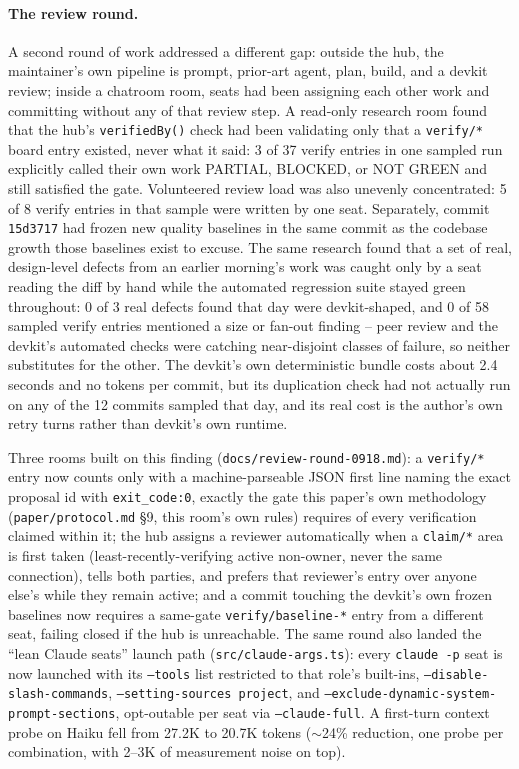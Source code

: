 \paragraph{The review round.} A second round of work addressed a different gap: outside
the hub, the maintainer's own pipeline is prompt, prior-art agent, plan, build, and a
devkit review; inside a chatroom room, seats had been assigning each other work and
committing without any of that review step. A read-only research room found that the
hub's \texttt{verifiedBy()} check had been validating only that a \texttt{verify/*} board
entry existed, never what it said: 3 of 37 verify entries in one sampled run explicitly
called their own work PARTIAL, BLOCKED, or NOT GREEN and still satisfied the gate.
Volunteered review load was also unevenly concentrated: 5 of 8 verify entries in that
sample were written by one seat. Separately, commit \texttt{15d3717} had frozen new
quality baselines in the same commit as the codebase growth those baselines exist to
excuse. The same research found that a set of real, design-level defects from an earlier
morning's work was caught only by a seat reading the diff by hand while the automated
regression suite stayed green throughout: 0 of 3 real defects found that day were
devkit-shaped, and 0 of 58 sampled verify entries mentioned a size or fan-out finding --
peer review and the devkit's automated checks were catching near-disjoint classes of
failure, so neither substitutes for the other. The devkit's own deterministic bundle
costs about 2.4 seconds and no tokens per commit, but its duplication check had not
actually run on any of the 12 commits sampled that day, and its real cost is the
author's own retry turns rather than devkit's own runtime.

Three rooms built on this finding (\texttt{docs/review-round-0918.md}): a
\texttt{verify/*} entry now counts only with a machine-parseable JSON first line
naming the exact proposal id with \texttt{exit\_code:0}, exactly the gate this paper's
own methodology (\texttt{paper/protocol.md} \S9, this room's own rules) requires of
every verification claimed within it; the hub assigns a reviewer automatically when a
\texttt{claim/*} area is first taken (least-recently-verifying active non-owner,
never the same connection), tells both parties, and prefers that reviewer's entry over
anyone else's while they remain active; and a commit touching the devkit's own frozen
baselines now requires a same-gate \texttt{verify/baseline-*} entry from a different
seat, failing closed if the hub is unreachable. The same round also landed the ``lean
Claude seats'' launch path (\texttt{src/claude-args.ts}): every \texttt{claude -p} seat
is now launched with its \texttt{--tools} list restricted to that role's built-ins,
\texttt{--disable-slash-commands}, \texttt{--setting-sources project}, and
\texttt{--exclude-dynamic-system-prompt-sections}, opt-outable per seat via
\texttt{--claude-full}. A first-turn context probe on Haiku fell from 27.2K to 20.7K
tokens ($\sim$24\% reduction, one probe per combination, with 2--3K of measurement
noise on top).

